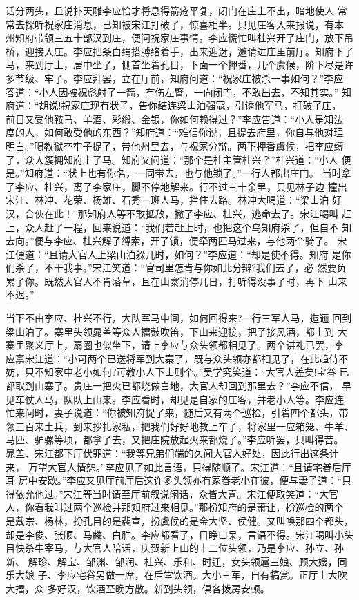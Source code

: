 话分两头，且说扑天雕李应恰才将息得箭疮平复，闭门在庄上不出，暗地使人
常常去探听祝家庄消息，已知被宋江打破了，惊喜相半。只见庄客入来报说，有本
州知府带领三五十部汉到庄，便问祝家庄事情。李应慌忙叫杜兴开了庄门，放下吊
桥，迎接入庄。李应把条白绢搭膊络着手，出来迎迓，邀请进庄里前厅。知府下了
马，来到厅上，居中坐了，侧首坐着孔目，下面一个押番，几个虞候，阶下尽是许
多节级、牢子。李应拜罢，立在厅前，知府问道：“祝家庄被杀一事如何？”李应
答道：“小人因被祝彪射了一箭，有伤左臂，一向闭门，不敢出去，不知其实。”
知府道：“胡说!祝家庄现有状子，告你结连梁山泊强寇，引诱他军马，打破了庄，
前日又受他鞍马、羊酒、彩缎、金银，你如何赖得过？”李应告道：“小人是知法
度的人，如何敢受他的东西？”知府道：“难信你说，且提去府里，你自与他对理
明白。”喝教狱卒牢子捉了，带他州里去，与祝家分辩。两下押番虞候，把李应缚
了，众人簇拥知府上了马。知府又问道：“那个是杜主管杜兴？”杜兴道：“小人
便是。”知府道：“状上也有你名，一同带去，也与他锁了。”一行人都出庄门。
当时拿了李应、杜兴，离了李家庄，脚不停地解来。行不过三十余里，只见林子边
撞出宋江、林冲、花荣、杨雄、石秀一班人马，拦住去路。林冲大喝道：“梁山泊
好汉，合伙在此！”那知府人等不敢抵敌，撇了李应、杜兴，逃命去了。宋江喝叫
赶上，众人赶了一程，回来说道：“我们若赶上时，也把这个鸟知府杀了，但自不
知去向。”便与李应、杜兴解了缚索，开了锁，便牵两匹马过来，与他两个骑了。
宋江便道：“且请大官人上梁山泊躲几时，如何？”李应道：“却是使不得。知府
是你们杀了，不干我事。”宋江笑道：“官司里怎肯与你如此分辩?我们去了，必
然要负累了你。既然大官人不肯落草，且在山寨消停几日，打听得没事了时，再下
山来不迟。”

当下不由李应、杜兴不行，大队军马中间，如何回得来?一行三军人马，迤逦
回到梁山泊了。寨里头领晁盖等众人擂鼓吹笛，下山来迎接，把了接风酒，都上到
大寨里聚义厅上，扇圈也似坐下，请上李应与众头领都相见了。两个讲礼已罢，李
应禀宋江道：“小可两个已送将军到大寨了，既与众头领亦都相见了，在此趋侍不
妨，只不知家中老小如何?可教小人下山则个。”吴学究笑道：“大官人差矣!宝眷
已都取到山寨了。贵庄一把火已都烧做白地，大官人却回到那里去？”李应不信，
早见车仗人马，队队上山来。李应看时，却见是自家的庄客，并老小人等。李应连
忙来问时，妻子说道：“你被知府捉了来，随后又有两个巡检，引着四个都头，带
领三百来土兵，到来抄扎家私，把我们好好地教上车子，将家里一应箱笼、牛羊、
马匹、驴骡等项，都拿了去，又把庄院放起火来都烧了。”李应听罢，只叫得苦。
晁盖、宋江都下厅伏罪道：“我等兄弟们端的久闻大官人好处，因此行出这条计来，
万望大官人情恕。”李应见了如此言语，只得随顺了。宋江道：“且请宅眷后厅耳
房中安歇。”李应又见厅前厅后这许多头领亦有家眷老小在彼，便与妻子道：“只
得依允他过。”宋江等当时请至厅前叙说闲话，众皆大喜。宋江便取笑道：“大官
人，你看我叫过两个巡检并那知府过来相见。”那扮知府的是萧让，扮巡检的两个
是戴宗、杨林，扮孔目的是裴宣，扮虞候的是金大坚、侯健。又叫唤那四个都头，
却是李俊、张顺、马麟、白胜。李应都看了，目睁口呆，言语不得。宋江喝叫小头
目快杀牛宰马，与大官人陪话，庆贺新上山的十二位头领，乃是李应、孙立、孙新、
解珍、解宝、邹渊、邹润、杜兴、乐和、时迁，女头领扈三娘、顾大嫂，同乐大娘
子、李应宅眷另做一席，在后堂饮酒。大小三军，自有犒赏。正厅上大吹大擂，众
多好汉，饮酒至晚方散。新到头领，俱各拨房安顿。

